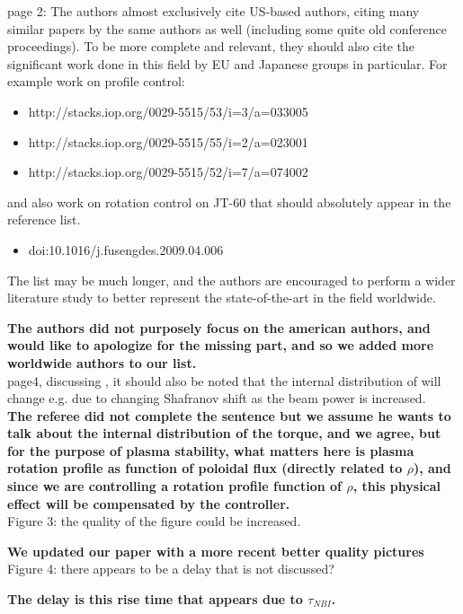 \documentclass{scrartcl}
\newcommand{\response}[1]{\textcolor{red!80!black}{\bf #1}}
\begin{document}
page 2: The authors almost exclusively cite US-based authors, citing many similar papers by the same authors as well (including some quite old conference proceedings). To be more complete and relevant, they should also cite the significant work done in this field by EU and Japanese groups in particular. For example work on profile control:
\begin{itemize}
\item http://stacks.iop.org/0029-5515/53/i=3/a=033005 
\item http://stacks.iop.org/0029-5515/55/i=2/a=023001 
\item http://stacks.iop.org/0029-5515/52/i=7/a=074002 
\end{itemize}
and also work on rotation control on JT-60 that should absolutely appear in the reference list.
\begin{itemize}
\item doi:10.1016/j.fusengdes.2009.04.006 
\end{itemize}
The list may be much longer, and the authors are encouraged to perform a wider literature study to better represent the state-of-the-art in the field worldwide.

\response{The authors did not purposely focus on the american authors, and would like to apologize for the missing part, and so we added more worldwide authors to our list.}\\

page4, discussing , it should also be noted that the internal distribution of will change e.g. due to changing Shafranov shift as the beam power is increased.\\

\response{The referee did not complete the sentence but we assume he wants to talk about the internal distribution of the torque, and we agree, but for the purpose of plasma stability, what matters here is plasma rotation profile as function of poloidal flux (directly related to $\rho$), and since we are controlling a rotation profile function of $\rho$, this physical effect will be compensated by the controller.} \\

Figure 3: the quality of the figure could be increased.

\response{We updated our paper with a more recent better quality pictures}\\

Figure 4: there appears to be a delay that is not discussed?

\response{The delay is this rise time that appears due to $\tau_{NBI}$.} \\
\end{document}
